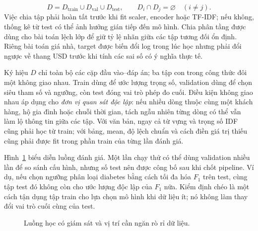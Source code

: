 \documentclass[12pt,a4paper]{report}
\begin{document}
\begin{equation}D=D_{\mathrm{train}}\cup D_{\mathrm{val}}\cup D_{\mathrm{test}},\qquad D_i\cap D_j=\varnothing\quad(i\ne j).\end{equation}
Việc chia tập phải hoàn tất trước khi fit scaler, encoder hoặc TF-IDF; nếu không, thống kê từ test có thể ảnh hưởng gián tiếp đến mô hình. Chia phân tầng được dùng cho bài toán lệch lớp để giữ tỷ lệ nhãn giữa các tập tương đối ổn định. Riêng bài toán giá nhà, target được biến đổi log trong lúc học nhưng phải đổi ngược về thang USD trước khi tính các sai số có ý nghĩa thực tế.

Ký hiệu $D$ chỉ toàn bộ các cặp đầu vào--đáp án; ba tập con trong công thức đôi một không giao nhau. Train dùng để ước lượng trọng số, validation dùng để chọn siêu tham số và ngưỡng, còn test đóng vai trò phép đo cuối. Điều kiện không giao nhau áp dụng cho \emph{đơn vị quan sát độc lập}: nếu nhiều dòng thuộc cùng một khách hàng, hộ gia đình hoặc chuỗi thời gian, tách ngẫu nhiên từng dòng có thể vẫn làm lộ thông tin giữa các tập. Với văn bản, ngay cả từ vựng và trọng số IDF cũng phải học từ train; với bảng, mean, độ lệch chuẩn và cách điền giá trị thiếu cũng phải được fit trong phần train của từng lần đánh giá.

Hình~\ref{fig:essay03-ml-pipeline} biểu diễn luồng đánh giá. Một lần chạy thử có thể dùng validation nhiều lần để so sánh cấu hình, nhưng số test nên được công bố sau khi chốt pipeline. Ví dụ, nếu chọn ngưỡng phân loại diabetes bằng cách tối đa hóa $F_1$ trên test, cùng tập test đó không còn cho ước lượng độc lập của $F_1$ nữa. Kiểm định chéo là một cách tận dụng tập train cho lựa chọn mô hình khi dữ liệu ít; nó không làm thay đổi vai trò cuối cùng của test.
\begin{figure}[htbp]\centering
{}
\caption{Luồng học có giám sát và vị trí cần ngăn rò rỉ dữ liệu.}\label{fig:essay03-ml-pipeline}
\end{figure}
\end{document}
